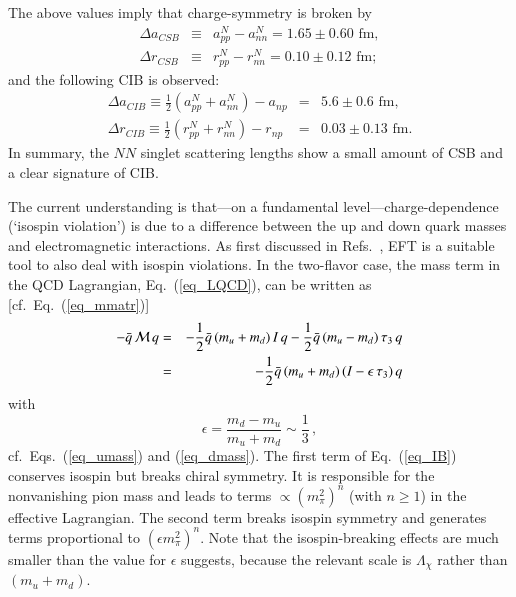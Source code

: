 \documentclass[sort&compress,preprint,3p]{elsarticle}
\begin{document}
The above values imply that
charge-symmetry is broken by
\begin{eqnarray}
\Delta a_{CSB}& \equiv& a_{pp}^N-a_{nn}^N = 1.65\pm 0.60 \mbox{ fm}, 
\label{eq_CSBlep1}
\\
\Delta r_{CSB}& \equiv& r_{pp}^N-r_{nn}^N = 0.10\pm 0.12 \mbox{ fm}; 
\label{eq_CSBlep2}
\end{eqnarray}
and
the following CIB is observed:
\begin{eqnarray}
\Delta a_{CIB} \equiv
\frac12 ( a_{pp}^N + a_{nn}^N )
 - 
 a_{np}
 &=& 5.6\pm 0.6 \mbox{ fm},
\label{eq_CIBlep1}
\\
\Delta r_{CIB} \equiv
 \frac12 ( r_{pp}^N + r_{nn}^N )
 - 
 r_{np}
 &=& 0.03\pm 0.13 \mbox{ fm}.
\label{eq_CIBlep2}
\end{eqnarray}
In summary, the $NN$ singlet scattering lengths show a small amount
of CSB and a clear signature of CIB.

The current understanding is that---on a fundamental level---charge-dependence
(`isospin violation') is due to a difference between the up and down quark masses
and electromagnetic interactions. 
As first discussed in Refs.~\cite{Kol93,Kol95,KFG96}, 
EFT is a suitable tool to also deal with isospin violations.
In the two-flavor case, the mass term in the QCD
Lagrangian, Eq.~(\ref{eq_LQCD}), can be written as [cf.\ Eq.~(\ref{eq_mmatr})]
\begin{eqnarray}
-
\bar{q} \,
 {\cal M} \, q
 & = & -\frac12 \bar{q} \, (m_u+m_d) \, I \, q - \frac12 \bar{q} \, (m_u-m_d) \, \tau_3 \,q
 \nonumber \\
 & = & -\frac12 \bar{q} \, (m_u+m_d) \, ( I -   \epsilon \, \tau_3 ) \, q
 \label{eq_IB}
\end{eqnarray}
with
\begin{equation}
\epsilon = \frac{m_d-m_u}{m_u+m_d} \sim  \frac13 \,,
\end{equation}
cf.\ Eqs.~(\ref{eq_umass}) and (\ref{eq_dmass}).
The first term of Eq.~(\ref{eq_IB}) conserves isospin but breaks chiral symmetry.
It is responsible for the nonvanishing pion mass and leads to terms $\propto (m_\pi^2)^n$
(with $n\geq 1$)
in the effective Lagrangian. The second term breaks isospin symmetry and generates
terms proportional to $(\epsilon m_\pi^2)^n$. Note that the isospin-breaking
effects are much smaller than the value for $\epsilon$ suggests, because the relevant scale
is $\Lambda_\chi$ rather than $(m_u+m_d)$. 
\end{document}
